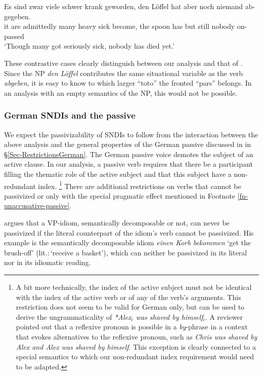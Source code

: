 \documentclass[output=paper]{langsci/langscibook}
\begin{document}
\ea
\gll Es sind zwar viele schwer krank geworden, den L\"offel hat aber noch niemand ab-gegeben.\\
it are admittedly many heavy sick become, the spoon has but still nobody on-passed\\
\glt `Though many got seriously sick, nobody has died yet.'\label{loeffel-kontrast}
\z

These contrastive cases clearly distinguish between our analysis and that of \cite{kaysagidioms}. Since the NP \textit{den L\"offel} contributes the same situational variable as the verb \textit{abgeben}, it is easy to know to which larger ``toto'' the fronted ``pars'' belongs. In an analysis with an empty semantics of the NP, this would not be possible.


\subsubsection{German SNDIs and the passive}

We expect the passivizability of SNDIs to follow from 
the interaction between the above analysis and
the general properties of the German passive discussed in
in §\ref{Sec-RestrictionsGerman}. 
The German passive voice demotes the subject of an active clause. In our analysis, a passive verb requires that there be a participant filling the thematic role of the active subject and that this subject have a non-redundant index.%
\footnote{A bit more technically, the index of the active subject must not be identical with the index of the active verb or of any of the verb's arguments. 
This restriction does not seem to be valid for German only, but can be used to derive the ungrammaticality of \textit{*Alex$_i$ was shaved by himself$_i$}. 
A reviewer pointed out that a reflexive pronoun is possible in a \textit{by}-phrase in a context that evokes alternatives to the reflexive pronoun, such as \textit{Chris was shaved by Alex and Alex was shaved by himself}. 
This exception is clearly connected to a special semantics to which our non-redundant index requirement would need to be adapted.}
%
There are additional restrictions on verbs that cannot be passivized or only with the special pragmatic effect mentioned in Footnote \ref{fn-unaccusative-passive}.

\cite{Dobrovolskij:00}
argues that a VP-idiom,  semantically decomposable or not, can never be passivized if the literal counterpart of the idiom's verb cannot be passivized. 
His example is the semantically decomposable idiom \textit{einen Korb bekommen} `get the brush-off' (lit.:\,`receive a basket'), which can neither be passivized in its literal nor in its idiomatic reading.
\end{document}

